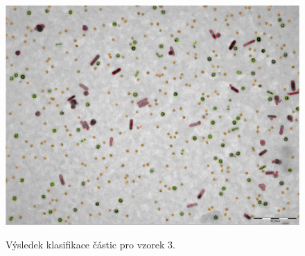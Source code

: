 \documentclass[11pt,twoside,a4paper,table]{book}
\begin{document}
\begin{figure}[h]
\center
\includegraphics[width=\textwidth]{figures/multi4_klasifikace.png}
\label{fig:class1}
\caption{Výsledek klasifikace částic pro vzorek 3.}
\end{figure}
\end{document}
